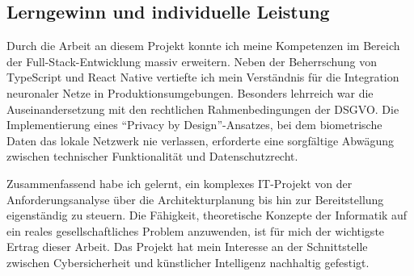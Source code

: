 \subsection{Lerngewinn und individuelle Leistung}
Durch die Arbeit an diesem Projekt konnte ich meine Kompetenzen im Bereich der Full-Stack-Entwicklung massiv erweitern. Neben der Beherrschung von TypeScript und React Native vertiefte ich mein Verständnis für die Integration neuronaler Netze in Produktionsumgebungen. Besonders lehrreich war die Auseinandersetzung mit den rechtlichen Rahmenbedingungen der DSGVO. Die Implementierung eines \enquote{Privacy by Design}-Ansatzes, bei dem biometrische Daten das lokale Netzwerk nie verlassen, erforderte eine sorgfältige Abwägung zwischen technischer Funktionalität und Datenschutzrecht.

Zusammenfassend habe ich gelernt, ein komplexes IT-Projekt von der Anforderungsanalyse über die Architekturplanung bis hin zur Bereitstellung eigenständig zu steuern. Die Fähigkeit, theoretische Konzepte der Informatik auf ein reales gesellschaftliches Problem anzuwenden, ist für mich der wichtigste Ertrag dieser Arbeit. Das Projekt hat mein Interesse an der Schnittstelle zwischen Cybersicherheit und künstlicher Intelligenz nachhaltig gefestigt.


